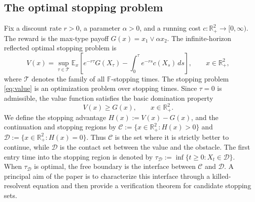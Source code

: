 \documentclass[pdflatex,sn-mathphys-num]{sn-jnl}
\theoremstyle{plain}
\theoremstyle{definition}
\theoremstyle{remark}
\numberwithin{equation}{section}
\begin{document}
\subsection{The optimal stopping problem} \label{subsec:optimal-stopping-problem} 
Fix a discount rate \(r>0\), a parameter \(\alpha>0\), and a running cost \(c:\mathbb R_+^2\to[0,\infty)\). The reward is the max-type payoff 
$\displaystyle G(x)=x_1\vee \alpha x_2$. 
The infinite-horizon reflected optimal stopping problem is 
\begin{equation} \label{eq:value} 
V(x) = \sup_{\tau\in\mathcal T} \mathbb E_x \left[ e^{-r\tau}G(X_\tau) - \int_0^\tau e^{-rs}c(X_s)\,ds \right], \qquad x\in\mathbb R_+^2 , \end{equation} 
where \(\mathcal T\) denotes the family of all \(\mathbb F\)-stopping times. The stopping problem \eqref{eq:value} is an optimization problem over stopping times. Since \(\tau=0\) is admissible, the value function satisfies the basic domination property 
\begin{equation} \label{eq:value-dominates-payoff} 
V(x)\ge G(x), \qquad x\in\mathbb R_+^2 . 
\end{equation} 
We define the stopping advantage 
$H(x):=V(x)-G(x)$, 
and the continuation and stopping regions by 
$\displaystyle \mathcal C:=\{x\in\mathbb R_+^2:H(x)>0\}$ and $\displaystyle \mathcal D:=\{x\in\mathbb R_+^2:H(x)=0\}$. 
Thus \(\mathcal C\) is the set where it is strictly better to continue, while \(\mathcal D\) is the contact set between the value and the obstacle. The first entry time into the stopping region is denoted by 
$\displaystyle \tau_{\mathcal D}:=\inf\{t\ge0:X_t\in\mathcal D\}$. 
When \(\tau_{\mathcal D}\) is optimal, the free boundary is the interface between \(\mathcal C\) and \(\mathcal D\). 
A principal aim of the paper is to characterize this interface through a killed-resolvent equation and then provide a verification theorem for candidate stopping sets. 
\end{document}
